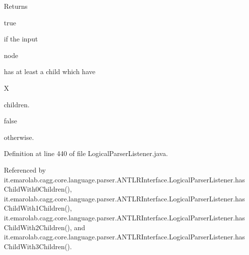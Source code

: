 \begin{DoxyReturn}{Returns}

\begin{DoxyCode}
\textcolor{keyword}{true} 
\end{DoxyCode}
 if the input
\begin{DoxyCode}
node 
\end{DoxyCode}
 has at least a child which have
\begin{DoxyCode}
X 
\end{DoxyCode}
 children.
\begin{DoxyCode}
\textcolor{keyword}{false} 
\end{DoxyCode}
 otherwise. 
\end{DoxyReturn}


Definition at line 440 of file Logical\-Parser\-Listener.\-java.



Referenced by it.\-emarolab.\-cagg.\-core.\-language.\-parser.\-A\-N\-T\-L\-R\-Interface.\-Logical\-Parser\-Listener.\-has\-Child\-With0\-Children(), it.\-emarolab.\-cagg.\-core.\-language.\-parser.\-A\-N\-T\-L\-R\-Interface.\-Logical\-Parser\-Listener.\-has\-Child\-With1\-Children(), it.\-emarolab.\-cagg.\-core.\-language.\-parser.\-A\-N\-T\-L\-R\-Interface.\-Logical\-Parser\-Listener.\-has\-Child\-With2\-Children(), and it.\-emarolab.\-cagg.\-core.\-language.\-parser.\-A\-N\-T\-L\-R\-Interface.\-Logical\-Parser\-Listener.\-has\-Child\-With3\-Children().

